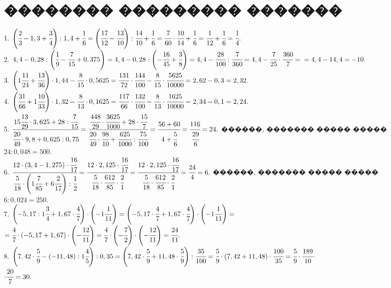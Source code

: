 \documentclass[12pt]{article}
\begin{document}
\section{�������� ��������� �������}
1. $\left(\cfrac{2}{3}-1,3+\cfrac{3}{4}\right):1,4+\cfrac{1}{6}=\left(\cfrac{17}{12}-\cfrac{13}{10}\right):\cfrac{14}{10}+\cfrac{1}{6}=\cfrac{7}{60}\cdot\cfrac{10}{14}+\cfrac{1}{6}=
\cfrac{1}{12}+\cfrac{1}{6}=\cfrac{1}{4}.$\\
2. $4,4-0,28:\left(\cfrac{1}{9}-\cfrac{7}{15}+0,375\right)=4,4-0,28:\left(-\cfrac{16}{45}+\cfrac{3}{8}\right)=4,4-\cfrac{28}{100}:\cfrac{7}{360}=4,4-\cfrac{7}{25}\cdot\cfrac{360}{7}=
\\=4,4-14,4=-10.$\\
3. $\left(1\cfrac{11}{24}+\cfrac{13}{36}\right)\cdot1,44-\cfrac{8}{15}\cdot0,5625=\cfrac{131}{72}\cdot\cfrac{144}{100}-\cfrac{8}{15}\cdot\cfrac{5625}{10000}=
2,62-0,3=2,32.$\\
4. $\left(\cfrac{31}{66}+1\cfrac{10}{33}\right)\cdot1,32-\cfrac{8}{13}\cdot0,1625=\cfrac{117}{66}\cdot\cfrac{132}{100}-\cfrac{8}{13}\cdot\cfrac{1625}{10000}=
2,34-0,1=2,24.$\\
5. $\cfrac{15\cfrac{13}{29}\cdot3,625+28:\cfrac{7}{15}}{\cfrac{20}{49}\cdot9,8+0,625:0,75}=\cfrac{\cfrac{448}{29}\cdot\cfrac{3625}{1000}+28\cdot\cfrac{15}{7}}{\cfrac{20}{49}\cdot\cfrac{98}{10}+\cfrac{625}{1000}:\cfrac{75}{100}}=
\cfrac{56+60}{4+\cfrac{5}{6}}=\cfrac{116}{\cfrac{29}{6}}=24.$ ������, ������� ����� ����� \\$24:0,048=500.$\\
6. $\cfrac{12\cdot(3,4-1,275)\cdot\cfrac{16}{17}}{\cfrac{5}{18}\cdot\left(1\cfrac{7}{85}
+6\cfrac{2}{17}\right):\cfrac{1}{2}}=\cfrac{12\cdot2,125\cdot\cfrac{16}{17}}{\cfrac{5}{18}\cdot\cfrac{612}{85}\cdot\cfrac{2}{1}}=
\cfrac{12\cdot2,125\cdot\cfrac{16}{17}}{\cfrac{5}{18}\cdot\cfrac{612}{85}\cdot\cfrac{2}{1}}=\cfrac{24}{4}=6.$ ������, ������� ����� ����� $6:0,024=250.$\\
7. $\left(-5,17:1\cfrac{3}{4}+1,67\cdot\cfrac{4}{7}\right)\cdot\left(-1\cfrac{1}{11}\right)=\left(-5,17\cdot\cfrac{4}{7}+1,67\cdot\cfrac{4}{7}\right)\cdot\left(-1\cfrac{1}{11}\right)=$\\
$=\cfrac{4}{7}\cdot\left(-5,17+1,67\right)\cdot\left(-\cfrac{12}{11}\right)=\cfrac{4}{7}\cdot\left(-\cfrac{7}{2}\right)\cdot\left(-\cfrac{12}{11}\right)=\cfrac{24}{11}.$\\
8. $\left(7,42\cdot\cfrac{5}{9}-(-11,48):1\cfrac{4}{5}\right):0,35=\left(7,42\cdot\cfrac{5}{9}+11,48\cdot\cfrac{5}{9}\right):\cfrac{35}{100}=
\cfrac{5}{9}\cdot\left(7,42+11,48\right)\cdot\cfrac{100}{35}=\cfrac{5}{9}\cdot\cfrac{189}{10}\cdot$\\$\cdot\cfrac{20}{7}=30.$\\
\end{document}
